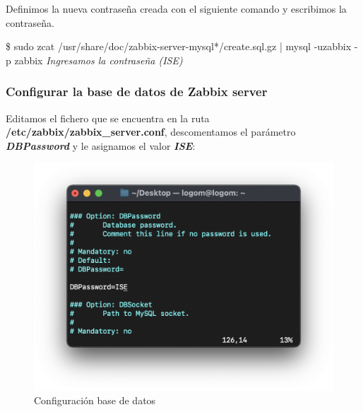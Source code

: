     Definimos la nueva contraseña creada con el siguiente comando y escribimos la contraseña.
        \begin{tcolorbox}[colback=black!10, halign=left]
            \$ sudo zcat /usr/share/doc/zabbix-server-mysql*/create.sql.gz | mysql -uzabbix -p zabbix
            \emph{Ingresamos la contraseña (ISE)}
        \end{tcolorbox}

    \subsubsection{Configurar la base de datos de Zabbix server}
    Editamos el fichero que se encuentra en la ruta \textbf{/etc/zabbix/zabbix\_server.conf}, descomentamos el parámetro \textbf{\emph{DBPassword}} y le
    asignamos el valor \textbf{\emph{ISE}}:
    \begin{figure}[H]
        \centering
        \includegraphics[scale=0.4]{images/zabbix_server_conf.png}
        \caption{Configuración base de datos}
        \label{fig:zabbix_conf}
    \end{figure}

